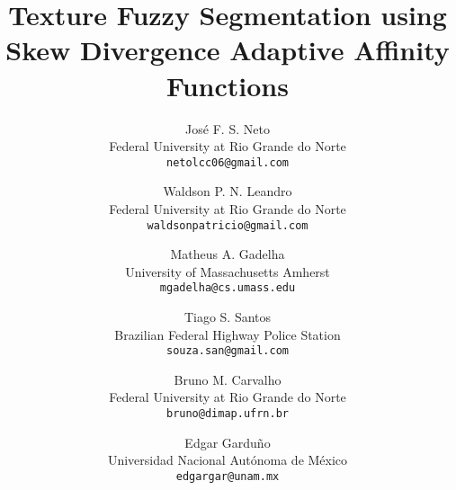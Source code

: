 \documentclass[10pt,twocolumn,letterpaper]{article}
\begin{document}
\title{Texture Fuzzy Segmentation using Skew Divergence Adaptive Affinity Functions}

\author{Jos\'{e} F. S. Neto\\
Federal University at Rio Grande do Norte\\
{\tt\small netolcc06@gmail.com}
\and
Waldson P. N. Leandro\\
Federal University at Rio Grande do Norte\\
{\tt\small waldsonpatricio@gmail.com}
\and
Matheus A. Gadelha\\
University of Massachusetts Amherst\\
{\tt\small mgadelha@cs.umass.edu}
\and
Tiago S. Santos\\
Brazilian Federal Highway Police Station\\
{\tt\small souza.san@gmail.com}
\and
Bruno M. Carvalho\\
Federal University at Rio Grande do Norte\\
{\tt\small bruno@dimap.ufrn.br}
\and
Edgar Gardu\~{n}o\\
Universidad Nacional Aut\'{o}noma de M\'{e}xico\\
{\tt\small edgargar@unam.mx}
}


\maketitle
\end{document}
